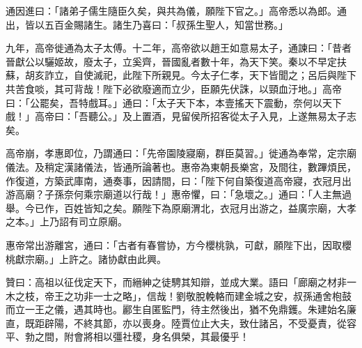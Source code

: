 \begin{pinyinscope}
通因進曰：「諸弟子儒生隨臣久矣，與共為儀，願陛下官之。」高帝悉以為郎。通出，皆以五百金賜諸生。諸生乃喜曰：「叔孫生聖人，知當世務。」

九年，高帝徙通為太子太傅。十二年，高帝欲以趙王如意易太子，通諫曰：「昔者晉獻公以驪姬故，廢太子，立奚齊，晉國亂者數十年，為天下笑。秦以不早定扶蘇，胡亥詐立，自使滅祀，此陛下所親見。今太子仁孝，天下皆聞之；呂后與陛下共苦食啖，其可背哉！陛下必欲廢適而立少，臣願先伏誅，以頸血汙地。」高帝曰：「公罷矣，吾特戲耳。」通曰：「太子天下本，本壹搖天下震動，奈何以天下戲！」高帝曰：「吾聽公。」及上置酒，見留侯所招客從太子入見，上遂無易太子志矣。

高帝崩，孝惠即位，乃謂通曰：「先帝園陵寢廟，群臣莫習。」徙通為奉常，定宗廟儀法。及稍定漢諸儀法，皆通所論著也。惠帝為東朝長樂宮，及間往，數蹕煩民，作復道，方築武庫南，通奏事，因請間，曰：「陛下何自築復道高帝寢，衣冠月出游高廟？子孫奈何乘宗廟道以行哉！」惠帝懼，曰：「急壞之。」通曰：「人主無過舉。今已作，百姓皆知之矣。願陛下為原廟渭北，衣冠月出游之，益廣宗廟，大孝之本。」上乃詔有司立原廟。

惠帝常出游離宮，通曰：「古者有春嘗协，方今櫻桃孰，可獻，願陛下出，因取櫻桃獻宗廟。」上許之。諸协獻由此興。

贊曰：高祖以征伐定天下，而縉紳之徒騁其知辯，並成大業。語曰「廊廟之材非一木之枝，帝王之功非一士之略」，信哉！劉敬脫輓輅而建金城之安，叔孫通舍枹鼓而立一王之儀，遇其時也。酈生自匿監門，待主然後出，猶不免鼎鑊。朱建始名廉直，既距辟陽，不終其節，亦以喪身。陸賈位止大夫，致仕諸呂，不受憂責，從容平、勃之間，附會將相以彊社稷，身名俱榮，其最優乎！


\end{pinyinscope}